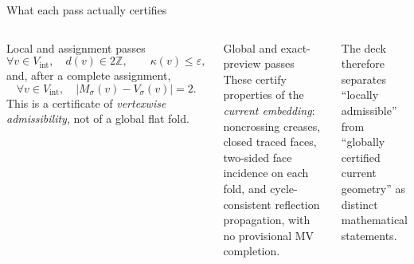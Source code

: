\documentclass[aspectratio=169,10pt]{beamer}
\newcommand{\ZZ}{\mathbb{Z}}
\newcommand{\eps}{\varepsilon}
\newcommand{\abs}[1]{\left\lvert #1\right\rvert}
\begin{document}
\begin{frame}{What each pass actually certifies}
\begin{columns}[T,onlytextwidth]
\begin{block}{Local and assignment passes}
\footnotesize
\[
\forall v\in V_{\mathrm{int}},\quad
d(v)\in 2\ZZ,\qquad
\kappa(v)\le \eps,
\]
and, after a complete assignment,
\[
\forall v\in V_{\mathrm{int}},\quad
\abs{M_\sigma(v)-V_\sigma(v)}=2.
\]
This is a certificate of \emph{vertexwise admissibility}, not of a global flat
fold.
\end{block}

\begin{alertblock}{Global and exact-preview passes}
\footnotesize
These certify properties of the \emph{current embedding}: noncrossing creases,
closed traced faces, two-sided face incidence on each fold, and cycle-consistent
reflection propagation, with no provisional MV completion.
\end{alertblock}

\smallskip
\footnotesize The deck therefore separates ``locally admissible'' from
``globally certified current geometry'' as distinct mathematical statements.
\end{columns}
\end{frame}
\end{document}
